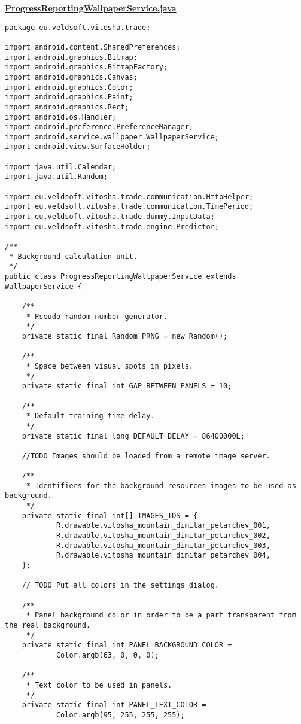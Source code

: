 \textbf{\underline{ProgressReportingWallpaperService.java}}
\begin{verbatim}
package eu.veldsoft.vitosha.trade;

import android.content.SharedPreferences;
import android.graphics.Bitmap;
import android.graphics.BitmapFactory;
import android.graphics.Canvas;
import android.graphics.Color;
import android.graphics.Paint;
import android.graphics.Rect;
import android.os.Handler;
import android.preference.PreferenceManager;
import android.service.wallpaper.WallpaperService;
import android.view.SurfaceHolder;

import java.util.Calendar;
import java.util.Random;

import eu.veldsoft.vitosha.trade.communication.HttpHelper;
import eu.veldsoft.vitosha.trade.communication.TimePeriod;
import eu.veldsoft.vitosha.trade.dummy.InputData;
import eu.veldsoft.vitosha.trade.engine.Predictor;

/**
 * Background calculation unit.
 */
public class ProgressReportingWallpaperService extends WallpaperService {

    /**
     * Pseudo-random number generator.
     */
    private static final Random PRNG = new Random();

    /**
     * Space between visual spots in pixels.
     */
    private static final int GAP_BETWEEN_PANELS = 10;

    /**
     * Default training time delay.
     */
    private static final long DEFAULT_DELAY = 86400000L;

    //TODO Images should be loaded from a remote image server.

    /**
     * Identifiers for the background resources images to be used as background.
     */
    private static final int[] IMAGES_IDS = {
            R.drawable.vitosha_mountain_dimitar_petarchev_001,
            R.drawable.vitosha_mountain_dimitar_petarchev_002,
            R.drawable.vitosha_mountain_dimitar_petarchev_003,
            R.drawable.vitosha_mountain_dimitar_petarchev_004,
    };

    // TODO Put all colors in the settings dialog.

    /**
     * Panel background color in order to be a part transparent from the real background.
     */
    private static final int PANEL_BACKGROUND_COLOR =
            Color.argb(63, 0, 0, 0);

    /**
     * Text color to be used in panels.
     */
    private static final int PANEL_TEXT_COLOR =
            Color.argb(95, 255, 255, 255);


\end{verbatim}
